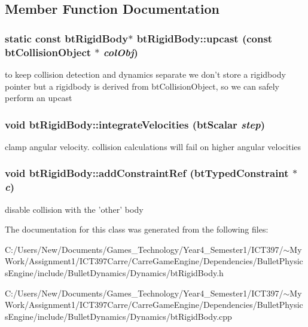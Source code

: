 \subsection{Member Function Documentation}
\hypertarget{classbt_rigid_body_59077fce3d2efd193a3fd7d7de2c97e8}{
\subsubsection[upcast]{\setlength{\rightskip}{0pt plus 5cm}static const {\bf btRigidBody}$\ast$ btRigidBody::upcast (const btCollisionObject $\ast$ {\em colObj})}}
\label{classbt_rigid_body_59077fce3d2efd193a3fd7d7de2c97e8}


to keep collision detection and dynamics separate we don't store a rigidbody pointer but a rigidbody is derived from btCollisionObject, so we can safely perform an upcast \hypertarget{classbt_rigid_body_16029bc5aabcbb33aaf7e6e6e819283a}{
\subsubsection[integrateVelocities]{\setlength{\rightskip}{0pt plus 5cm}void btRigidBody::integrateVelocities (btScalar {\em step})}}
\label{classbt_rigid_body_16029bc5aabcbb33aaf7e6e6e819283a}




clamp angular velocity. collision calculations will fail on higher angular velocities \hypertarget{classbt_rigid_body_1c89df31d2a10f06cc81da0e4b573297}{
\subsubsection[addConstraintRef]{\setlength{\rightskip}{0pt plus 5cm}void btRigidBody::addConstraintRef (btTypedConstraint $\ast$ {\em c})}}
\label{classbt_rigid_body_1c89df31d2a10f06cc81da0e4b573297}




disable collision with the 'other' body 

The documentation for this class was generated from the following files:\begin{CompactItemize}
\item 
C:/Users/New/Documents/Games\_\-Technology/Year4\_\-Semester1/ICT397/$\sim$My Work/Assignment1/ICT397Carre/CarreGameEngine/Dependencies/BulletPhysicsEngine/include/BulletDynamics/Dynamics/btRigidBody.h\item 
C:/Users/New/Documents/Games\_\-Technology/Year4\_\-Semester1/ICT397/$\sim$My Work/Assignment1/ICT397Carre/CarreGameEngine/Dependencies/BulletPhysicsEngine/include/BulletDynamics/Dynamics/btRigidBody.cpp\end{CompactItemize}
